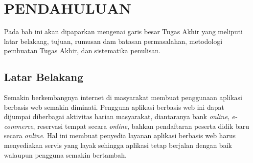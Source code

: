 \documentclass{ta-its}
\begin{document}
    \tableofcontents %
    \listoftables %
    \listoffigures %

\mainmatter %
    \chapter{PENDAHULUAN}
        Pada bab ini akan dipaparkan mengenai garis besar Tugas Akhir yang meliputi latar belakang, tujuan, rumusan dam batasan permasalahan, metodologi pembuatan Tugas Akhir, dan sistematika penulisan.

        \section{Latar Belakang}
            Semakin berkembangnya internet di masyarakat membuat penggunaan aplikasi berbasis web semakin diminati. Pengguna aplikasi berbasis web ini dapat dijumpai diberbagai aktivitas harian masyarakat, diantaranya bank \emph{online}, \emph{e-commerce}, reservasi tempat secara \emph{online}, bahkan pendaftaran peserta didik baru secara \emph{online}. Hal ini membuat penyedia layanan aplikasi berbasis web harus menyediakan servis yang layak sehingga aplikasi tetap berjalan dengan baik walaupun pengguna semakin bertambah.\\
\end{document}
